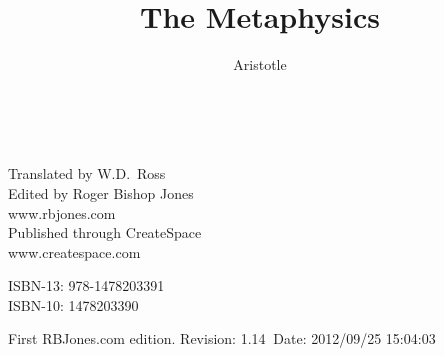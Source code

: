 \newcommand{\dq}{\texttt{"}}


\title{The Metaphysics}
\author{Aristotle}
\date{\ }



\renewcommand{\thechapter}{Book \arabic{chapter}}
\renewcommand{\thesection}{Part \arabic{section}}

\addtolength{\cftchapnumwidth}{3em}
\addtolength{\cftsecnumwidth}{2.5em}
\addtolength{\cftsubsecnumwidth}{0.5em}
\cftsetpnumwidth{2em}

\frontmatter

\begin{titlepage}
\maketitle

\hspace{2in}

\vfill

\begin{centering}

Translated by W.D.~Ross\\
\vspace{0.2in}
Edited by Roger Bishop Jones\\
www.rbjones.com\\
\vspace{0.2in}
Published through CreateSpace\\
www.createspace.com\\
\vspace{0.2in}

ISBN-13: 978-1478203391\\
ISBN-10: 1478203390

\vspace{0.2in}

{\footnotesize

First RBJones.com edition. $ $Revision: 1.14 $~$Date: 2012/09/25 15:04:03 $ $

}%

\end{centering}

\thispagestyle{empty}
\end{titlepage}


{\parskip=0pt\tableofcontents}
\vfill

